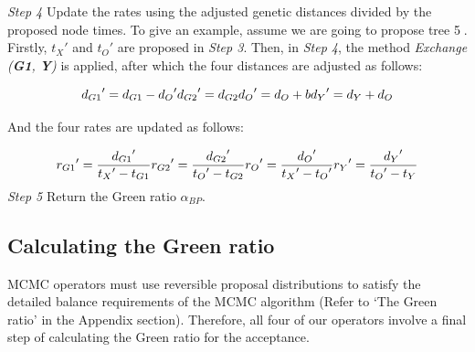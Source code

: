 \documentclass{bmcart}
\begin{document}
\emph{Step 4}  Update the rates using the adjusted genetic distances divided by the proposed node times. To give an example, assume we are going to propose tree \textcircled5. Firstly, ${t_X}'$ and ${t_O}'$ are proposed in \emph{Step 3}.  Then, in \emph{Step 4}, the method \textit{Exchange (\textbf{G1}, \textbf{Y})} is applied, after which the four distances are adjusted as follows:

\begin{equation}\label{example2.1}
{d_{G1}}' = {d_{G1}} - {d_O}'  \\
{d_{G2}}' = {d_{G2}}  \\
{d_O}' = {d_O} + b  \\
{d_Y}' = {d_Y} + {d_O}
\end{equation}

And the four rates are updated as follows:

\begin{equation}\label{example2.2}
{r_{G1}}' = \frac{{{d_{G1}}'}}{{{t_X}' - {t_{G1}}}} \\
{r_{G2}}' = \frac{{{d_{G2}}'}}{{{t_O}' - {t_{G2}}}} \\
{r_O}' = \frac{{{d_O}'}}{{{t_X}' - {t_O}'}} \\
{r_Y}' = \frac{{{d_Y}'}}{{{t_O}' - {t_Y}}}
\end{equation}
\emph{Step 5} Return the Green ratio ${\alpha_{BP}}$.

\subsection*{Calculating the Green ratio}
MCMC operators must use reversible proposal distributions to satisfy the detailed balance requirements of the MCMC algorithm (Refer to `The Green ratio' in the Appendix section). Therefore, all four of our operators involve a final step of calculating the Green ratio for the acceptance.
\end{document}
